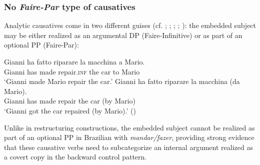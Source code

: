 \documentclass[output=paper]{langsci/langscibook}
\begin{document}
\subsubsection{No \textit{Faire-Par} type of causatives} %

Analytic causatives come in two different guises (cf. \citealt{Kayne1975}; \citealt{Huber1980}; \citealt{Burzio1986}; \citealt{Enzinger2010}; \citealt{Campanini2012}): the embedded subject may be either realized as an argumental DP  (Faire-Infinitive) or as part of an optional  PP (Faire-Par):

\ea%
         \label{ex:moreno:18}
    \ea  
    \gll Gianni ha  fatto   riparare    la   macchina a Mario.\\
         Gianni has made repair.\textsc{inf} the car    to Mario \\
    \glt ‘Gianni made Mario repair the car.’
    \ex  
    \gll Gianni ha fatto    riparare   la  macchina   (da Mario). \\
         Gianni has made repair   the car  (by Mario) \\
    \glt ‘Gianni got the car repaired (by Mario).’ (\citealt{Campanini2012})
    \z
\z

Unlike in  restructuring constructions, the embedded subject cannot be realized as part of an optional  PP in Brazilian  with \textit{mandar\slash fazer}, providing strong evidence that these causative verbs need to subcategorize an internal argument realized as a covert copy in the backward control pattern. 

    \z
\end{document}
